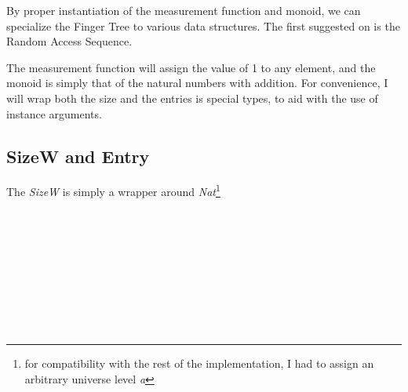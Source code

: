 \documentclass[12pt,twoside,notitlepage]{report}
\begin{document}
By proper instantiation of the measurement function and monoid, we can specialize the Finger Tree to various data structures. The first suggested on is the Random Access Sequence.

The measurement function will assign the value of 1 to any element, and the monoid is simply that of the natural numbers with addition. For convenience, I will wrap both the size and the entries is special types, to aid with the use of instance arguments.

\subsection{SizeW and Entry}

The \textit{SizeW} is simply a wrapper around \textit{Nat}\footnote{for compatibility with the rest of the implementation, I had to assign an arbitrary universe level \textit{a}} 


\begin{code}
\\
\>[0]\<[2]%
\>[2]  \AgdaSymbol{\{}\AgdaSymbol{\}} \AgdaSymbol{:}   \<[26]%
\>[26]\<%
\\
\>[2]\<[4]%
\>[4] \AgdaSymbol{:}  \AgdaSymbol{(} \AgdaSymbol{:} \AgdaSymbol{)}   \AgdaSymbol{\{}\AgdaSymbol{\}}\<%
\\
\>[0]\<[2]%
\>[2] \AgdaSymbol{:}  \AgdaSymbol{\{} \AgdaSymbol{:} \AgdaSymbol{\}}   \AgdaSymbol{\{}\AgdaSymbol{\}}\<%
\\
\>[0]\<[2]%
\>[2] \AgdaSymbol{=}  \<%
\\
%
\\
\>[0]\<[2]%
\>[2] \AgdaSymbol{:} \<[9]%
\>[9] \AgdaSymbol{\{}\AgdaSymbol{\}}   \AgdaSymbol{\{}\AgdaSymbol{\}}   \AgdaSymbol{\{}\AgdaSymbol{\}}   \AgdaSymbol{\{}\AgdaSymbol{\}}\<%
\\
\>[0]\<[2]%
\>[2]     \AgdaSymbol{=}  \AgdaSymbol{(} \AgdaPrimitive{+} \AgdaSymbol{)}\<%
\\
\end{code}
\end{document}
